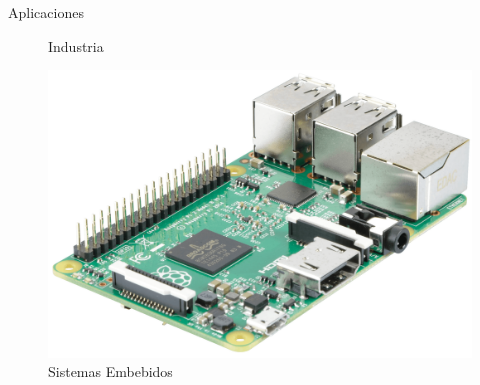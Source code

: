 \documentclass{beamer}
\begin{document}
\begin{frame}[t]{Aplicaciones}
\begin{multicols}{3}
\begin{figure}
			\caption{Industria}	
		\end{figure}
		\begin{figure}
			\centering
			\includegraphics[scale=0.045]{embedded}
			\caption{Sistemas Embebidos}
		\end{figure}
	\end{multicols}
\end{frame}
\end{document}
